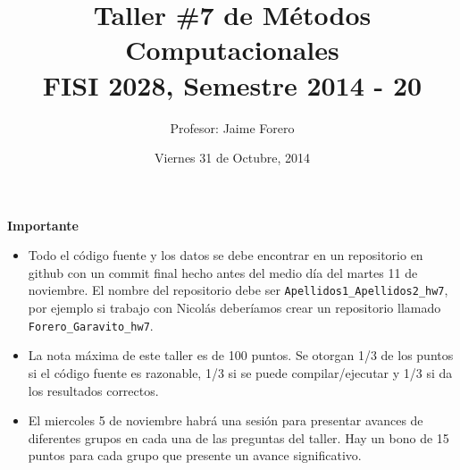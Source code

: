 \documentclass{article}
\title{Taller \#7 de M\'etodos Computacionales\\ FISI 2028, Semestre 2014 - 20}
\author{Profesor: Jaime Forero}
\date{Viernes 31 de Octubre, 2014}
\begin{document}
\maketitle
\thispagestyle{empty}


{\bf Importante}
\begin{itemize}

\item Todo el c\'odigo fuente y los datos se debe encontrar en un
  repositorio en github con un commit final hecho antes del medio
  d\'ia del martes 11 de noviembre. El nombre del repositorio debe ser
  \verb"Apellidos1_Apellidos2_hw7", por ejemplo si trabajo con
  Nicol\'as deber\'iamos crear un repositorio llamado
  \verb"Forero_Garavito_hw7".  

\item 
  La nota m\'axima de este taller es de 100 puntos. Se otorgan 1/3
  de los puntos si el c\'odigo fuente es razonable, 1/3 si se puede
  compilar/ejecutar y 1/3 si da los resultados correctos.  

\item
  El miercoles 5 de noviembre habr\'a una sesi\'on para presentar
  avances de diferentes grupos en cada una de las preguntas del
  taller. Hay un bono de 15 puntos para cada grupo que presente un
  avance significativo.  


\end{itemize}
\end{document}
